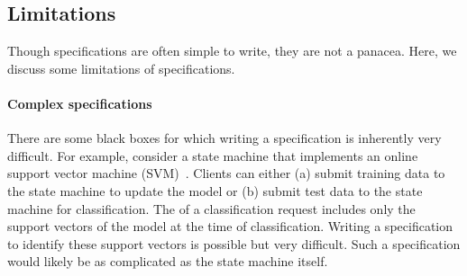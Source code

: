%

\subsection{Limitations}
Though \watprovenance{} specifications are often simple to write, they are not
a panacea. Here, we discuss some limitations of \watprovenance{}
specifications.

\paragraph{Complex \watprovenance{} specifications}
There are some black boxes for which writing a \watprovenance{} specification
is inherently very difficult. For example, consider a state machine that
implements an online support vector machine (SVM)~\cite{hearst1998support,
laskov2006incremental, bordes12huller}. Clients can either (a) submit training
data to the state machine to update the model or (b) submit test data to the
state machine for classification. The \watprovenance{} of a classification
request includes only the support vectors of the model at the time of
classification. Writing a \watprovenance{} specification to identify these
support vectors is possible but very difficult. Such a \watprovenance{}
specification would likely be as complicated as the state machine itself.

